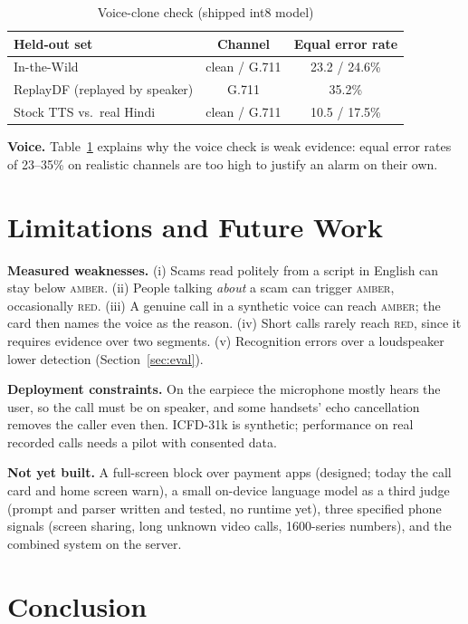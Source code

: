 \documentclass[conference,a4paper]{IEEEtran}
\newcommand{\amber}{\textsc{amber}}
\newcommand{\red}{\textsc{red}}
\begin{document}
\begin{table}[t]
\centering
\caption{Voice-clone check (shipped int8 model)}
\label{tab:voice}
\small
\begin{tabular}{@{}lcc@{}}
\toprule
Held-out set & Channel & Equal error rate \\
\midrule
In-the-Wild & clean / G.711 & 23.2 / 24.6\% \\
ReplayDF (replayed by speaker) & G.711 & 35.2\% \\
Stock TTS vs.\ real Hindi & clean / G.711 & 10.5 / 17.5\% \\
\bottomrule
\end{tabular}
\end{table}

\textbf{Voice.} Table~\ref{tab:voice} explains why the voice check is weak evidence: equal error rates of 23--35\%
on realistic channels are too high to justify an alarm on their own.

\section{Limitations and Future Work}
\label{sec:limits}

\textbf{Measured weaknesses.} (i) Scams read politely from a script in English can stay below \amber{}. (ii) People
talking \emph{about} a scam can trigger \amber{}, occasionally \red{}. (iii) A genuine call in a synthetic voice can
reach \amber{}; the card then names the voice as the reason. (iv) Short calls rarely reach \red{}, since it requires
evidence over two segments. (v) Recognition errors over a loudspeaker lower detection (Section~\ref{sec:eval}).

\textbf{Deployment constraints.} On the earpiece the microphone mostly hears the user, so the call must be on
speaker, and some handsets' echo cancellation removes the caller even then. ICFD-31k is synthetic; performance on
real recorded calls needs a pilot with consented data.

\textbf{Not yet built.} A full-screen block over payment apps (designed; today the call card and home screen warn), a
small on-device language model as a third judge (prompt and parser written and tested, no runtime yet), three
specified phone signals (screen sharing, long unknown video calls, 1600-series numbers), and the combined system on
the server.

\section{Conclusion}
\end{document}
